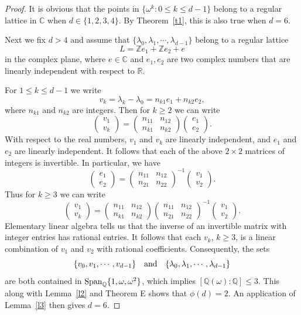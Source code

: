\documentclass[reqno,11pt]{amsart}
\newcommand{\C}{\mathbb C}
\newcommand{\R}{\mathbb R}
\newcommand{\Z}{\mathbb Z}
\newcommand{\Q}{\mathbb Q}
\begin{document}
\begin{proof}
It is obvious that the points in $\{\omega^k: 0\le k\le d-1\}$ 
belong to a regular lattice in $\C$ when $d\in\{1,2,3,4\}$. 
By Theorem~\ref{t1}, this is also true when $d=6$.

Next we fix $d>4$ and assume that 
$\{\lambda_0,\lambda_1,\cdots,\lambda_{d-1}\}$ belong 
to a regular lattice
$$L=\Z e_1+\Z e_2+e$$ 
in the complex plane, where $e\in\C$ and $e_1,e_2$ are two 
complex numbers that are linearly independent with respect 
to $\R$.

For $1\le k\le d-1$ we write
$$v_k=\lambda_k-\lambda_0=n_{k1}e_1+n_{k2}e_2,$$
where $n_{k1}$ and $n_{k2}$ are integers. Then for $k\ge2$
we can write
$$\begin{pmatrix}v_1\\ v_k\end{pmatrix}=
\begin{pmatrix}n_{11} & n_{12}\\ n_{k1} & n_{k2}\end{pmatrix}
\begin{pmatrix}e_1\\ e_2\end{pmatrix}.$$
With respect to the real numbers, $v_1$ and $v_k$ are linearly
independent, and $e_1$ and $e_2$ are linearly independent. It
follows that each of the above $2\times2$ matrices of integers
is invertible. In particular, we have
$$\begin{pmatrix}e_1\\ e_2\end{pmatrix}=\begin{pmatrix}
n_{11} & n_{12}\\ n_{21} & n_{22}\end{pmatrix}^{-1}
\begin{pmatrix}v_1\\ v_2\end{pmatrix}.$$
Thus for $k\ge3$ we can write
$$\begin{pmatrix}v_1\\ v_k\end{pmatrix}=\begin{pmatrix}
n_{11} & n_{12}\\ n_{k1} & n_{k2}\end{pmatrix}
\begin{pmatrix}n_{11} & n_{12}\\ n_{21} & n_{22}\end{pmatrix}^{-1}
\begin{pmatrix}v_1 \\ v_2\end{pmatrix}.$$
Elementary linear algebra tells us that the inverse of an invertible
matrix with integer entries has rational entries. It follows that each
$v_k$, $k\ge3$, is a linear combination of $v_1$ and $v_2$ with
rational coefficients. Consequently, the sets 
$$\{v_0, v_1,\cdots, v_{d-1}\}\quad{\rm and}\quad
\{\lambda_0,\lambda_1,\cdots,\lambda_{d-1}\}$$ 
are both contained in ${\rm Span}_{\Q}\{1,\omega,\omega^2\}$,
which implies $\left[\Q(\omega) : \Q\right]\le3$. This along with
Lemma~\ref{l2} and Theorem E shows that $\phi(d)=2$. An
application of Lemma~\ref{l3} then gives $d=6$.
\end{proof}
\end{document}

